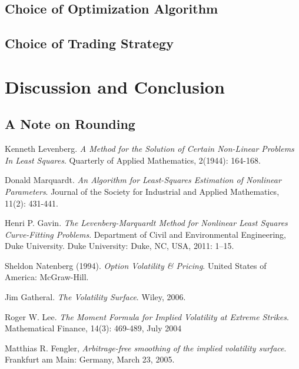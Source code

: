 \documentclass[12pt, a4paper, notitlepage]{article}
\numberwithin{equation}{subsection}
\numberwithin{figure}{subsection}
\numberwithin{table}{subsection}
\begin{document}
\subsection{Choice of Optimization Algorithm}
\label{subsec:ResultsChoiceOfOptAlgo}

\subsection{Choice of Trading Strategy}
\label{subsec:ResultsChoiceOfTradingStrategy}

\newpage
\section{Discussion and Conclusion} \label{sec:DiscussionAndConclusion}

\subsection{A Note on Rounding}

\newpage
\begin{thebibliography}{3}
	
    	Kenneth Levenberg.
        \textit{A Method for the Solution of Certain Non-Linear Problems In Least Squares}.
        Quarterly of Applied Mathematics, 2(1944): 164-168.
    
    	Donald Marquardt.
        \textit{An Algorithm for Least-Squares Estimation of Nonlinear Parameters}.  Journal of the Society for Industrial and Applied Mathematics, 11(2): 431-441.
        
        Henri P. Gavin.
        \textit{The Levenberg-Marquardt Method for Nonlinear Least Squares Curve-Fitting Problems}.
        Department of Civil and Environmental Engineering, Duke University.
        Duke University: Duke, NC, USA, 2011: 1–15.
    
    	Sheldon Natenberg (1994).
        \textit{Option Volatility \& Pricing}.
        United States of America:  McGraw-Hill.
    
    	Jim Gatheral.
        \textit{The Volatility Surface}.
        Wiley, 2006.
    
    	Roger W. Lee.
        \textit{The Moment Formula for Implied Volatility at Extreme Strikes}.
        Mathematical Finance, 14(3): 469-489, July 2004
    
	  Matthias R. Fengler,
	  \textit{Arbitrage-free smoothing of the implied volatility surface}.
	  Frankfurt am Main: Germany,
	  March 23, 2005.
	  

\end{thebibliography}
\end{document}
